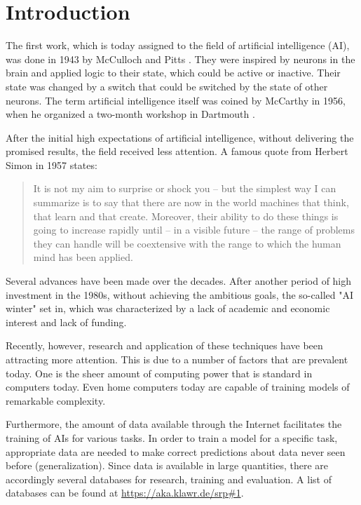 \section{Introduction}

The first work, which is today assigned to the field of artificial intelligence (AI), was done in 1943 by McCulloch and Pitts \cite{McCulloch1943}.
They were inspired by neurons in the brain and applied logic to their state, which could be active or inactive.
Their state was changed by a switch that could be switched by the state of other neurons.
The term artificial intelligence itself was coined by McCarthy in 1956, when he organized a two-month workshop in Dartmouth \cite{McCarthy1955}.

After the initial high expectations of artificial intelligence, without delivering the promised results, the field received less attention.
A famous quote from Herbert Simon in 1957 states: 
\begin{quotation}
    It is not my aim to surprise or shock you – but the simplest way I can summarize is to say that there are now in the world machines that think, that learn and that create. Moreover, their ability to do these things is going to increase rapidly until – in a visible future – the range of problems they can handle will be coextensive with the range to which the human mind has been applied.
\end{quotation}

Several advances have been made over the decades.
After another period of high investment in the 1980s, without achieving the ambitious goals, the so-called "AI winter" set in, which was characterized by a lack of academic and economic interest and lack of funding.

Recently, however, research and application of these techniques have been attracting more attention.
This is due to a number of factors that are prevalent today.
One is the sheer amount of computing power that is standard in computers today.
Even home computers today are capable of training models of remarkable complexity.

Furthermore, the amount of data available through the Internet facilitates the training of AIs for various tasks.
In order to train a model for a specific task, appropriate data are needed to make correct predictions about data never seen before (generalization).
Since data is available in large quantities, there are accordingly several databases for research, training and evaluation.
A list of databases can be found at \url{https://aka.klawr.de/srp\#1}.

